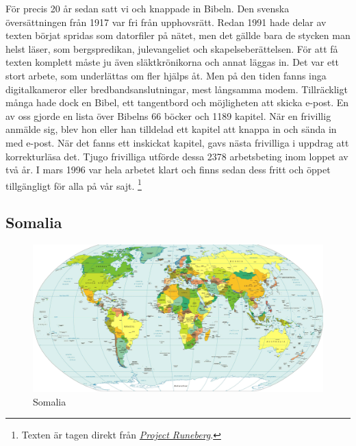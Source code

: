 \documentclass{article}[a4paper, 11pt]
\begin{document}
		För precis 20 år sedan satt vi och knappade in Bibeln. Den svenska översättningen från 1917 var fri från upphovsrätt. Redan 1991 hade delar av texten börjat spridas som datorfiler på nätet, men det gällde bara de stycken man helst läser, som bergspredikan, julevangeliet och skapelseberättelsen. För att få texten komplett måste ju även släktkrönikorna och annat läggas in. Det var ett stort arbete, som underlättas om fler hjälps åt. Men på den tiden fanns inga digitalkameror eller bredbandsanslutningar, mest långsamma modem. Tillräckligt många hade dock en Bibel, ett tangentbord och möjligheten att skicka e-post. En av oss gjorde en lista över Bibelns 66 böcker och 1189 kapitel. När en frivillig anmälde sig, blev hon eller han tilldelad ett kapitel att knappa in och sända in med e-post. När det fanns ett inskickat kapitel, gavs nästa frivilliga i uppdrag att korrekturläsa det. Tjugo frivilliga utförde dessa 2378 arbetsbeting inom loppet av två år. I mars 1996 var hela arbetet klart och finns sedan dess fritt och öppet tillgängligt för alla på vår sajt. \footnote{Texten är tagen direkt från \textit{\href{http://runeberg.org/}{Project Runeberg}}.}
	
		\subsection{Somalia}
			\begin{figure}[H]
				\includegraphics[viewport=2150 920 2270 1077, clip, angle=-12.34]{world}
				\caption{Somalia}
			\end{figure}
\end{document}
